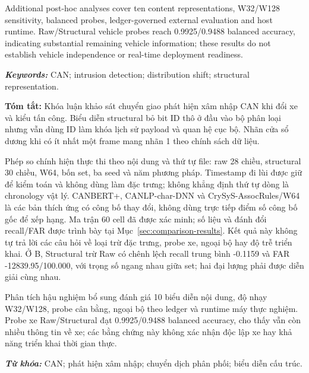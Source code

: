 \documentclass[12pt,a4paper,oneside,openany]{extbook}
\newcommand{\abstractchapter}[1]{\clearpage\phantomsection\addcontentsline{toc}{chapter}{#1}{\centering\fontsize{13}{13}\selectfont\bfseries\MakeUppercase{#1}\par}\vspace{12pt}}
\begin{document}
Additional post-hoc analyses cover ten content representations, W32/W128 sensitivity, balanced probes, ledger-governed external evaluation and host runtime. Raw/Structural vehicle probes reach 0.9925/0.9488 balanced accuracy, indicating substantial remaining vehicle information; these results do not establish vehicle independence or real-time deployment readiness.

\noindent\textbf{\textit{Keywords:}} CAN; intrusion detection; distribution shift; structural representation.
\par\endgroup

\abstractchapter{Tóm tắt}

\begingroup\fontsize{12}{12}\selectfont
\noindent\textbf{Tóm tắt:} Khóa luận khảo sát chuyển giao phát hiện xâm nhập CAN khi đổi xe và kiểu tấn công. Biểu diễn structural bỏ bit ID thô ở đầu vào bộ phân loại nhưng vẫn dùng ID làm khóa lịch sử payload và quan hệ cục bộ. Nhãn cửa sổ dương khi có ít nhất một frame mang nhãn 1 theo chính sách dữ liệu.

Phép so chính hiện thực thi theo nội dung và thứ tự file: raw 28 chiều, structural 30 chiều, W64, bốn set, ba seed và năm phương pháp. Timestamp đi lùi được giữ để kiểm toán và không dùng làm đặc trưng; không khẳng định thứ tự dòng là chronology vật lý. CANBERT+, CANLP-char-DNN và CrySyS-AssocRules/W64 là các bản thích ứng có công bố thay đổi, không dùng trực tiếp điểm số công bố gốc để xếp hạng. Ma trận 60 cell đã được xác minh; số liệu và đánh đổi recall/FAR được trình bày tại Mục~\ref{sec:comparison-results}. Kết quả này không tự trả lời các câu hỏi về loại trừ đặc trưng, probe xe, ngoại bộ hay độ trễ triển khai. Ở B, Structural trừ Raw có chênh lệch recall trung bình -0.1159 và FAR -12839.95/100.000, với trọng số ngang nhau giữa set; hai đại lượng phải được diễn giải cùng nhau.

Phân tích hậu nghiệm bổ sung đánh giá 10 biểu diễn nội dung, độ nhạy W32/W128, probe cân bằng, ngoại bộ theo ledger và runtime máy thực nghiệm. Probe xe Raw/Structural đạt 0.9925/0.9488 balanced accuracy, cho thấy vẫn còn nhiều thông tin về xe; các bằng chứng này không xác nhận độc lập xe hay khả năng triển khai thời gian thực.

\noindent\textbf{\textit{Từ khóa:}} CAN; phát hiện xâm nhập; chuyển dịch phân phối; biểu diễn cấu trúc.
\par\endgroup
\end{document}
